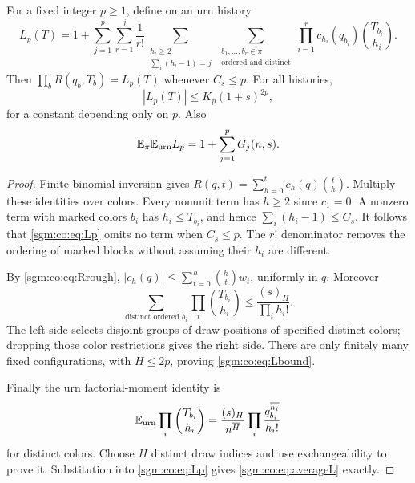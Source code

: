 \documentclass[11pt,letterpaper]{article}
\theoremstyle{remark}\newtheorem{remark}[theorem]{Remark}
\theoremstyle{definition}\newtheorem{definition}[theorem]{Definition}
\begin{document}
\begin{proposition}\label{sgm:co:prop:newton}
For a fixed integer $p\ge1$, define on an urn history
\begin{equation}\label{sgm:co:eq:Lp}
 L_p(T)=1+\sum_{j=1}^p\sum_{r=1}^j\frac1{r!}
 \sum_{\substack{h_i\ge2\\\sum_i(h_i-1)=j}}
 \sum_{\substack{b_1,\ldots,b_r\in\pi\\\text{ordered and distinct}}}
       \prod_{i=1}^rc_{h_i}(q_{b_i})\binom{T_{b_i}}{h_i}.
\end{equation}
Then $\prod_bR(q_b,T_b)=L_p(T)$ whenever $C_s\le p$. For all histories,
\begin{equation}\label{sgm:co:eq:Lbound}
 |L_p(T)|\le K_p(1+s)^{2p},
\end{equation}
for a constant depending only on $p$. Also
\begin{equation}\label{sgm:co:eq:averageL}
 \mathbb E_\pi\mathbb E_{\rm urn}L_p=1+\sum_{j=1}^pG_j(n,s).
\end{equation}
\end{proposition}
\begin{proof}
Finite binomial inversion gives $R(q,t)=\sum_{h=0}^tc_h(q)\binom th$. Multiply these identities over colors. Every nonunit term has $h\ge2$ since $c_1=0$. A nonzero term with marked colors $b_i$ has $h_i\le T_{b_i}$, and hence $\sum_i(h_i-1)\le C_s$. It follows that \eqref{sgm:co:eq:Lp} omits no term when $C_s\le p$. The $r!$ denominator removes the ordering of marked blocks without assuming their $h_i$ are different.

By \eqref{sgm:co:eq:Rrough}, $|c_h(q)|\le\sum_{t=0}^h\binom ht w_t$, uniformly in $q$. Moreover
\[
 \sum_{\text{distinct ordered }b_i}\prod_i\binom{T_{b_i}}{h_i}
 \le\frac{(s)_H}{\prod_i h_i!}.
\]
The left side selects disjoint groups of draw positions of specified distinct colors; dropping those color restrictions gives the right side. There are only finitely many fixed configurations, with $H\le2p$, proving \eqref{sgm:co:eq:Lbound}.

Finally the urn factorial-moment identity is
\[
 \mathbb E_{\rm urn}\prod_i\binom{T_{b_i}}{h_i}
 =\frac{(s)_H}{n^{\overline H}}\prod_i\frac{q_{b_i}^{\overline{h_i}}}{h_i!}
\]
for distinct colors. Choose $H$ distinct draw indices and use exchangeability to prove it. Substitution into \eqref{sgm:co:eq:Lp} gives \eqref{sgm:co:eq:averageL} exactly.
\end{proof}
\end{document}
